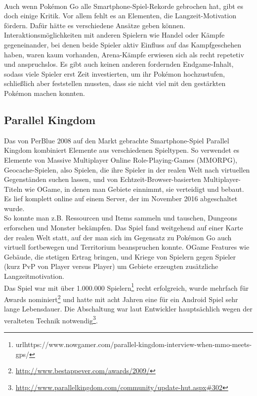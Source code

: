 \documentclass[extern,palatino]{cgBA}
\begin{document}
	\\Auch wenn Pokémon Go alle Smartphone-Spiel-Rekorde gebrochen hat, gibt es doch einige Kritik. Vor allem fehlt es an Elementen, die Langzeit-Motivation fördern. Dafür hätte es verschiedene Ansätze geben können. Interaktionsmöglichkeiten mit anderen Spielern wie Handel oder Kämpfe gegeneinander, bei denen beide Spieler aktiv Einfluss auf das Kampfgeschehen haben, waren kaum vorhanden, Arena-Kämpfe erwiesen sich als recht repetetiv und anspruchslos. Es gibt auch keinen anderen fordernden Endgame-Inhalt, sodass viele Spieler erst Zeit investierten, um ihr Pokémon hochzustufen, schließlich aber feststellen mussten, dass sie nicht viel mit den gestärkten Pokémon machen konnten. %
	\newpage
	\subsection{Parallel Kingdom}
	Das von PerBlue 2008 auf den Markt gebrachte Smartphone-Spiel Parallel Kingdom kombiniert Elemente aus verschiedenen Spieltypen. So verwendet es Elemente von Massive Multiplayer Online Role-Playing-Games (MMORPG), Geocache-Spielen, also Spielen, die ihre Spieler in der realen Welt nach virtuellen Gegenständen suchen lassen, und von Echtzeit-Browser-basierten Multiplayer-Titeln wie OGame, in denen man Gebiete einnimmt, sie verteidigt und bebaut. Es lief komplett online auf einem Server, der im November 2016 abgeschaltet wurde. %
	\\So konnte man z.B. Ressourcen und Items sammeln und tauschen, Dungeons erforschen und Monster bekämpfen. Das Spiel fand weitgehend auf einer Karte der realen Welt statt, auf der man sich im Gegensatz zu Pokémon Go auch virtuell fortbewegen und Territorium beanspruchen konnte. OGame Features wie Gebäude, die stetigen Ertrag bringen, und Kriege von Spielern gegen Spieler (kurz PvP von Player versus Player) um Gebiete erzeugten zusätzliche Langzeitmotivation.
	\\Das Spiel war mit über 1.000.000 Spielern\footnote{url{https://www.nowgamer.com/parallel-kingdom-interview-when-mmo-meets-gps/}} recht erfolgreich, wurde mehrfach für Awards nominiert\footnote{\url{http://www.bestappever.com/awards/2009/}} und hatte mit acht Jahren eine für ein Android Spiel sehr lange Lebensdauer. 
	Die Abschaltung war laut Entwickler hauptsächlich wegen der veralteten Technik notwendig\footnote{\url{http://www.parallelkingdom.com/community/update-hut.aspx\#302}}.
\end{document}
